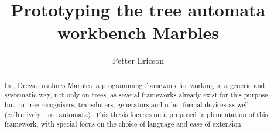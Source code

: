 \title{Prototyping the tree automata workbench Marbles}

\author{Petter Ericson}


\maketitle%

\begin{abstract}
In \cite{drewes_marbles}, Drewes outlines Marbles, a programming framework
for working in a generic and systematic way, not only on trees, as several
frameworks already exist for this purpose, but on tree recognisers,
transducers, generators and other formal devices as well (collectively:
tree automata). This thesis focuses on a proposed implementation of this
framework, with special focus on the choice of language and ease of
extension.
\end{abstract}
